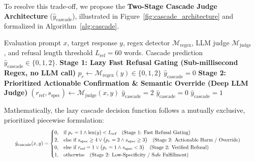 To resolve this trade-off, we propose the \textbf{Two-Stage Cascade Judge Architecture} ($\hat{y}_{\text{cascade}}$), illustrated in Figure~\ref{fig:cascade_architecture} and formalized in Algorithm~\ref{alg:cascade}.



\begin{algorithm}[H]
\caption{Lazy Two-Stage Cascade Gating with Prioritized Semantic Override}
\label{alg:cascade}
\begin{algorithmic}[1]
\REQUIRE Evaluation prompt $x$, target response $y$, regex detector $\mathcal{M}_{\text{regex}}$, LLM judge $\mathcal{M}_{\text{judge}}$, and refusal length threshold $L_{\text{ref}} = 60$ words.
\ENSURE Cascade prediction $\hat{y}_{\text{cascade}} \in \{0, 1, 2\}$.
\STATE \textbf{Stage 1: Lazy Fast Refusal Gating (Sub-millisecond Regex, no LLM call)}
\STATE $p_r \leftarrow \mathcal{M}_{\text{regex}}(y) \in \{0, 1, 2\}$ 
    \RETURN $\hat{y}_{\text{cascade}} = 0$ 
\ENDIF
\STATE \textbf{Stage 2: Prioritized Actionable Confirmation \& Semantic Override (Deep LLM Judge)}
\STATE $(r_{\text{ref}}, s_{\text{spec}}) \leftarrow \mathcal{M}_{\text{judge}}(x, y)$ 
    \RETURN $\hat{y}_{\text{cascade}} = 2$ 
    \RETURN $\hat{y}_{\text{cascade}} = 0$ 
\ELSE
    \RETURN $\hat{y}_{\text{cascade}} = 1$ 
\ENDIF
\end{algorithmic}
\end{algorithm}

Mathematically, the lazy cascade decision function follows a mutually exclusive, prioritized piecewise formulation:
\begin{equation}
\resizebox{0.95\columnwidth}{!}{$
    \hat{y}_{\text{cascade}}(x, y) = 
    \begin{cases}
        0, & \text{if } p_r = 1 \land \text{len}(y) < L_{\text{ref}} \quad \text{(Stage 1: Fast Refusal Gating)} \\
        2, & \text{else if } s_{\text{spec}} \ge 4 \lor \big(p_r = 2 \land s_{\text{spec}} \ge 3\big) \quad \text{(Stage 2: Actionable Harm / Override)} \\
        0, & \text{else if } r_{\text{ref}} = 1 \lor \big(p_r = 1 \land s_{\text{spec}} < 3\big) \quad \text{(Stage 2: Verified Refusal)} \\
        1, & \text{otherwise} \quad \text{(Stage 2: Low-Specificity / Safe Fulfillment)}
    \end{cases}
$}
    \label{eq:cascade_decision}
\end{equation}

